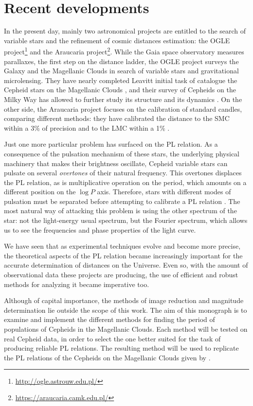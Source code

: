 \section{Recent developments}


In the present day, mainly two astronomical projects are entitled to the search of variable stars and the refinement of cosmic distances estimation:
the OGLE project\footnote{\url{http://ogle.astrouw.edu.pl/}} and the Araucaria project\footnote{\url{https://araucaria.camk.edu.pl/}}.
While the Gaia space observatory measures parallaxes, the first step on the distance ladder, 
the OGLE project surveys the Galaxy and the Magellanic Clouds in search of variable stars and gravitational microlensing.
They have nearly completed Leavitt initial task of catalogue the Cepheid stars on the Magellanic Clouds \citep{OGLE2017},
and their survey of Cepheids on the Milky Way has allowed to further study its structure \citep{Skowron2019} and its dynamics \citep{Mroz2019}.
On the other side, the Araucaria project focuses on the calibration of standard candles, comparing different methods: 
they have calibrated the distance to the SMC within a 3\% of precision \citep{Araucaria2014} and to the LMC within a 1\% \citep{Araucaria2019}.



Just one more particular problem has surfaced on the PL relation. 
As a consequence of the pulsation mechanism of these stars, 
the underlying physical machinery that makes their brightness oscillate,
Cepheid variable stars can pulsate on several \textit{overtones} of their natural frequency.
This overtones displaces the PL relation, as is multiplicative operation on the period, 
which amounts on a different position on the $\log P$ axis.
Therefore, stars with different modes of pulsation must be separated before attempting to calibrate a PL relation \citep{Zabolotski2005}.
The most natural way of attacking this problem is using the other spectrum of the star: 
not the light-energy usual spectrum, but the Fourier spectrum, 
which allows us to see the frequencies and phase properties of the light curve.

We have seen that as experimental techniques evolve and become more precise, 
the theoretical aspects of the PL relation became increasingly important for the accurate determination of distances on the Universe.
Even so, with the amount of observational data these projects are producing, 
the use of efficient and robust methods for analyzing it became imperative too.

Although of capital importance, the methods of image reduction and magnitude determination lie outside the scope of this work.
The aim of this monograph is to examine and implement the different methods for finding the period of populations of Cepheids in the Magellanic Clouds.
Each method will be tested on real Cepheid data, in order to select the one better suited for the task of producing reliable PL relations.
The resulting method will be used to replicate the PL relations of the Cepheids on the Magellanic Clouds given by \cite{OGLE2016}.



